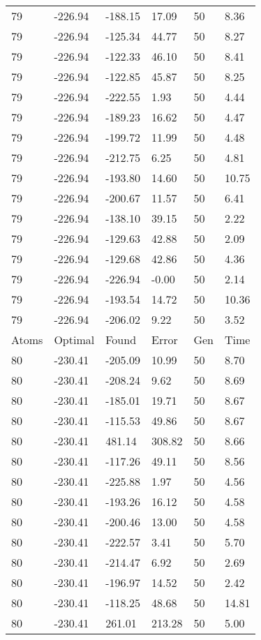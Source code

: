 \documentclass{report}
\begin{document}
\begin{appendix}
\begin{longtable}{llllll}
79 & -226.94 & -188.15 & 17.09 & 50 & 8.36 \\
79 & -226.94 & -125.34 & 44.77 & 50 & 8.27 \\
79 & -226.94 & -122.33 & 46.10 & 50 & 8.41 \\
79 & -226.94 & -122.85 & 45.87 & 50 & 8.25 \\
79 & -226.94 & -222.55 & 1.93 & 50 & 4.44 \\
79 & -226.94 & -189.23 & 16.62 & 50 & 4.47 \\
79 & -226.94 & -199.72 & 11.99 & 50 & 4.48 \\
79 & -226.94 & -212.75 & 6.25 & 50 & 4.81 \\
79 & -226.94 & -193.80 & 14.60 & 50 & 10.75 \\
79 & -226.94 & -200.67 & 11.57 & 50 & 6.41 \\
79 & -226.94 & -138.10 & 39.15 & 50 & 2.22 \\
79 & -226.94 & -129.63 & 42.88 & 50 & 2.09 \\
79 & -226.94 & -129.68 & 42.86 & 50 & 4.36 \\
79 & -226.94 & -226.94 & -0.00 & 50 & 2.14 \\
79 & -226.94 & -193.54 & 14.72 & 50 & 10.36 \\
79 & -226.94 & -206.02 & 9.22 & 50 & 3.52 \\
Atoms & Optimal & Found & Error & Gen & Time \\
80 & -230.41 & -205.09 & 10.99 & 50 & 8.70 \\
80 & -230.41 & -208.24 & 9.62 & 50 & 8.69 \\
80 & -230.41 & -185.01 & 19.71 & 50 & 8.67 \\
80 & -230.41 & -115.53 & 49.86 & 50 & 8.67 \\
80 & -230.41 & 481.14 & 308.82 & 50 & 8.66 \\
80 & -230.41 & -117.26 & 49.11 & 50 & 8.56 \\
80 & -230.41 & -225.88 & 1.97 & 50 & 4.56 \\
80 & -230.41 & -193.26 & 16.12 & 50 & 4.58 \\
80 & -230.41 & -200.46 & 13.00 & 50 & 4.58 \\
80 & -230.41 & -222.57 & 3.41 & 50 & 5.70 \\
80 & -230.41 & -214.47 & 6.92 & 50 & 2.69 \\
80 & -230.41 & -196.97 & 14.52 & 50 & 2.42 \\
80 & -230.41 & -118.25 & 48.68 & 50 & 14.81 \\
80 & -230.41 & 261.01 & 213.28 & 50 & 5.00 \\

\end{longtable}
\end{appendix}
\end{document}
